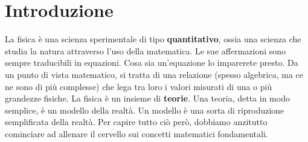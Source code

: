 \section{Introduzione}
La fisica è una scienza sperimentale di tipo \textbf{quantitativo}, ossia una scienza che studia la natura attraverso l'uso della matematica. Le sue affermazioni sono sempre traducibili in equazioni. Cosa sia un'equazione lo imparerete presto. Da un punto di vista matematico, si tratta di una relazione (spesso algebrica, ma ce ne sono di più complesse) che lega tra loro i valori misurati di una o più grandezze fisiche. La fisica è un insieme di \textbf{teorie}. Una teoria, detta in modo semplice, è un modello della realtà. Un modello è una sorta di riproduzione semplificata della realtà. Per capire tutto ciò però, dobbiamo anzitutto cominciare ad allenare il cervello sui concetti matematici fondamentali.
